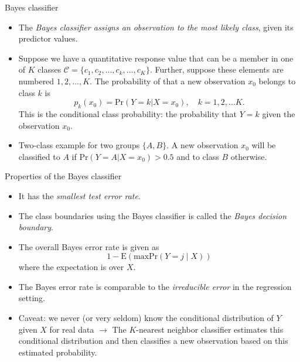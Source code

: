 \documentclass[ignorenonframetext,]{beamer}
\begin{document}
\begin{frame}

\begin{block}{Bayes classifier}

\begin{itemize}
\item
  The \emph{Bayes classifier assigns an observation to the most likely
  class}, given its predictor values.
\item
  Suppose we have a quantitative response value that can be a member in
  one of \(K\) classes
  \(\mathcal{C} = \{c_1, c_2, ..., c_k, ..., c_K\}\). Further, suppose
  these elements are numbered \(1, 2, ..., K\). The probability of that
  a new observation \(x_0\) belongs to class \(k\) is
  \[p_k(x_0) = \text{Pr}(Y=k | X=x_0), \quad k = 1, 2, ... K.\] This is
  the conditional class probability: the probability that \(Y=k\) given
  the observation \(x_0\).
\item
  Two-class example for two groups \(\{A, B\}\). A new observation
  \(x_0\) will be classified to \(A\) if
  \(\text{Pr}(Y=A | X=x_0) > 0.5\) and to class \(B\) otherwise.
\end{itemize}

\end{block}

\end{frame}

\begin{frame}

\begin{block}{Properties of the Bayes classifier}

\begin{itemize}
\item
  It has the \emph{smallest test error rate}.
\item
  The class boundaries using the Bayes classifier is called the
  \emph{Bayes decision boundary}.
\item
  The overall Bayes error rate is given as
  \[1-\text{E}(\text{max} \text{Pr}(Y=j\mid X))\] where the expectation
  is over \(X\).
\item
  The Bayes error rate is comparable to the \emph{irreducible error} in
  the regression setting.
\item
  Caveat: we never (or very seldom) know the conditional distribution of
  \(Y\) given \(X\) for real data \(\rightarrow\) The \(K\)-nearest
  neighbor classifier estimates this conditional distribution and then
  classifies a new observation based on this estimated probability.
\end{itemize}

\end{block}

\end{frame}
\end{document}
